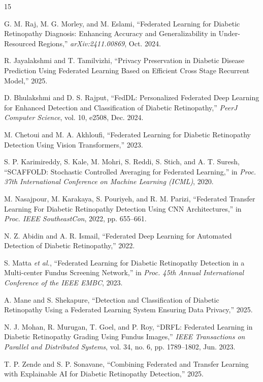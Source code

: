 \documentclass[12pt, a4paper]{article}
\begin{document}
\begin{thebibliography}{15}

G. M. Raj, M. G. Morley, and M. Eslami, ``Federated Learning for Diabetic Retinopathy Diagnosis: Enhancing Accuracy and Generalizability in Under-Resourced Regions,'' \textit{arXiv:2411.00869}, Oct. 2024.

R. Jayalakshmi and T. Tamilvizhi, ``Privacy Preservation in Diabetic Disease Prediction Using Federated Learning Based on Efficient Cross Stage Recurrent Model,'' 2025.

D. Bhulakshmi and D. S. Rajput, ``FedDL: Personalized Federated Deep Learning for Enhanced Detection and Classification of Diabetic Retinopathy,'' \textit{PeerJ Computer Science}, vol. 10, e2508, Dec. 2024.

M. Chetoui and M. A. Akhloufi, ``Federated Learning for Diabetic Retinopathy Detection Using Vision Transformers,'' 2023.

S. P. Karimireddy, S. Kale, M. Mohri, S. Reddi, S. Stich, and A. T. Suresh, ``SCAFFOLD: Stochastic Controlled Averaging for Federated Learning,'' in \textit{Proc. 37th International Conference on Machine Learning (ICML)}, 2020.

M. Nasajpour, M. Karakaya, S. Pouriyeh, and R. M. Parizi, ``Federated Transfer Learning For Diabetic Retinopathy Detection Using CNN Architectures,'' in \textit{Proc. IEEE SoutheastCon}, 2022, pp. 655--661.

N. Z. Abidin and A. R. Ismail, ``Federated Deep Learning for Automated Detection of Diabetic Retinopathy,'' 2022.

S. Matta \textit{et al.}, ``Federated Learning for Diabetic Retinopathy Detection in a Multi-center Fundus Screening Network,'' in \textit{Proc. 45th Annual International Conference of the IEEE EMBC}, 2023.

A. Mane and S. Shekapure, ``Detection and Classification of Diabetic Retinopathy Using a Federated Learning System Ensuring Data Privacy,'' 2025.

N. J. Mohan, R. Murugan, T. Goel, and P. Roy, ``DRFL: Federated Learning in Diabetic Retinopathy Grading Using Fundus Images,'' \textit{IEEE Transactions on Parallel and Distributed Systems}, vol. 34, no. 6, pp. 1789--1802, Jun. 2023.

T. P. Zende and S. P. Sonavane, ``Combining Federated and Transfer Learning with Explainable AI for Diabetic Retinopathy Detection,'' 2025.


\end{thebibliography}
\end{document}
